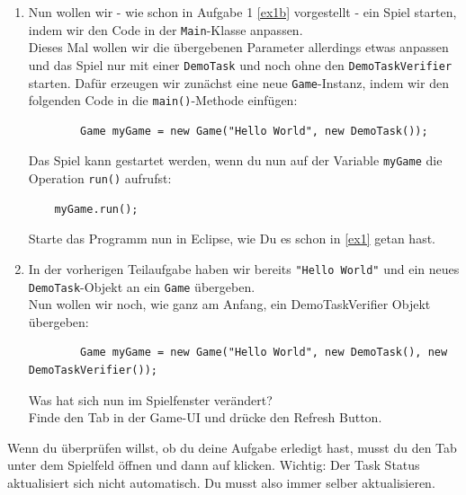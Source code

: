 
\label{ex3}

\begin{enumerate}
    \item Nun wollen wir - wie schon in Aufgabe 1 \ref{ex1b} vorgestellt - ein Spiel starten, indem wir den Code in der \lstinline{Main}-Klasse anpassen.\\
    Dieses Mal wollen wir die übergebenen Parameter allerdings etwas anpassen und das Spiel nur mit einer \lstinline{DemoTask} und noch ohne den \lstinline{DemoTaskVerifier} starten.
	Dafür erzeugen wir zunächst eine neue \lstinline{Game}-Instanz, indem wir den folgenden Code in die \lstinline{main()}-Methode einfügen:

    \begin{lstlisting}
		Game myGame = new Game("Hello World", new DemoTask());
    \end{lstlisting}

    Das Spiel kann gestartet werden, wenn du nun auf der Variable \lstinline{myGame} die Operation \lstinline{run()} aufrufst:

    \begin{lstlisting}
	myGame.run();
    \end{lstlisting}

    Starte das Programm nun in Eclipse, wie Du es schon in \ref{ex1} getan hast.

    \item In der vorherigen Teilaufgabe haben wir bereits \lstinline{"Hello World"} und ein neues \lstinline{DemoTask}-Objekt an ein \lstinline{Game} übergeben.\\
    Nun wollen wir noch, wie ganz am Anfang, ein DemoTaskVerifier Objekt übergeben:

    \begin{lstlisting}
		Game myGame = new Game("Hello World", new DemoTask(), new DemoTaskVerifier());
    \end{lstlisting}

        Was hat sich nun im Spielfenster verändert?\\
        Finde den  Tab in der Game-UI und drücke den Refresh Button.

\end{enumerate}


\begin{Infobox}
    Wenn du überprüfen willst, ob du deine Aufgabe erledigt hast, musst du den  Tab unter dem Spielfeld öffnen und dann auf  klicken.\newline
    Wichtig: Der Task Status aktualisiert sich nicht automatisch. Du musst also immer selber aktualisieren.
\end{Infobox}


